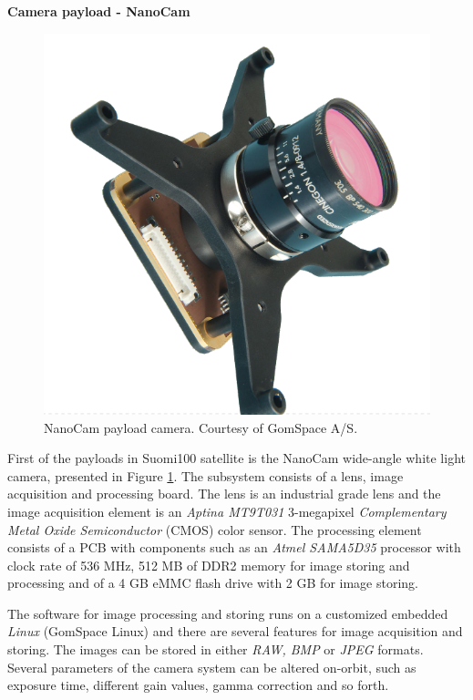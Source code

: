 \documentclass[english,12pt,a4paper,pdftex,elec,utf8]{aaltothesis}
\begin{document}
\textbf{Camera payload - NanoCam}\\
\begin{figure}[h!]
\centering
\includegraphics[scale=0.2]{nanocam}
\caption{NanoCam payload camera. Courtesy of GomSpace A/S. \cite{nanocamds}}
\label{nanocam}
\end{figure} 
First of the payloads in Suomi100 satellite is the NanoCam wide-angle white light camera, presented in Figure \ref{nanocam}. The subsystem consists of a lens, image acquisition and processing board. The lens is an industrial grade lens and the image acquisition element is an \textit{Aptina MT9T031} 3-megapixel \textit{Complementary Metal Oxide Semiconductor} (CMOS) color sensor. The processing element consists of a PCB with components such as an \textit{Atmel SAMA5D35} processor with clock rate of 536 MHz, 512 MB of DDR2 memory for image storing and processing and of a 4 GB eMMC flash drive with 2 GB for image storing. \cite{nanocamds}\par
The software for image processing and storing runs on a customized embedded \textit{Linux} (GomSpace Linux) and there are several features for image acquisition and storing. The images can be stored in either \textit{RAW, BMP} or \textit{JPEG} formats. Several parameters of the camera system can be altered on-orbit, such as exposure time, different gain values, gamma correction and so forth. \cite{nanocamds}
\end{document}
